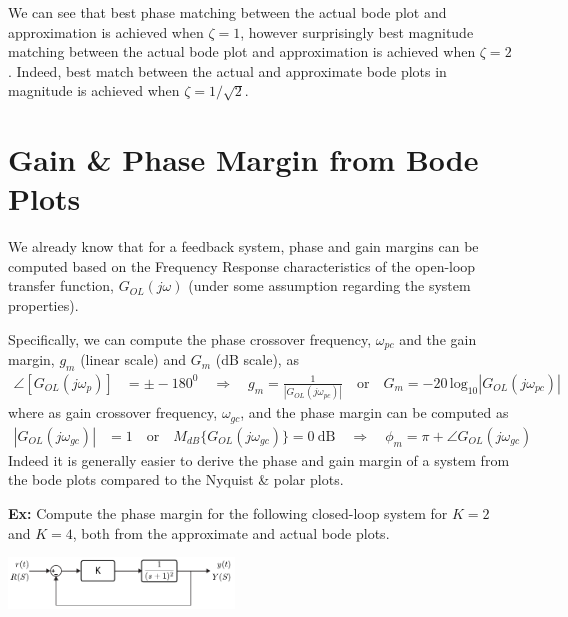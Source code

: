 \documentclass[twoside]{article}
\begin{document}
\vspace{6 pt}

We can see that best phase matching between the actual bode plot and approximation is achieved when
$\zeta = 1$, however surprisingly best magnitude matching between the actual bode plot and approximation is achieved when
$\zeta = 2$. Indeed, best match between the actual and approximate bode plots in magnitude is achieved when $\zeta = 1/\sqrt{2}$. 

\newpage

\section{Gain \& Phase Margin from Bode Plots}

We already know that for a feedback system, phase and 
gain margins can be computed based on the Frequency Response
characteristics of the open-loop transfer function, $G_{OL}(j \omega)$ (under
some assumption regarding the system properties).

Specifically, we can compute the phase crossover frequency, $\omega_{pc}$ and the gain margin, 
$g_m$ (linear scale) and $G_m$ (dB scale), as
%
\begin{align*}
  \angle [ G_{OL}(j \omega_{p}) ] &= \pm -180^0
  \quad \Rightarrow \quad
  g_m = \frac{1}{| G_{OL}(j \omega_{pc})| } \quad \mathrm{or} \quad G_m
  = -20 \, \mathrm{log}_{10} | G_{OL}(j \omega_{pc} ) |
\end{align*}
%
where as gain crossover frequency, $\omega_{gc}$, and the 
phase margin can be computed as
%
\begin{align*}
  | G_{OL}(j \omega_{gc}) | &= 1 \quad \mathrm{or} \quad 
  M_{dB} \lbrace G_{OL}(j \omega_{gc}) \rbrace = 0 \ \mathrm{dB}
   \quad \Rightarrow \quad
  \phi_m = \pi + \angle G_{OL} (j \omega_{gc})
\end{align*}
% 
Indeed it is generally easier to derive the phase and gain margin of
a system from the bode plots compared to the Nyquist \& polar plots.

\textbf{Ex:} Compute the phase margin 
for the following closed-loop system for $K = 2$ and $K = 4$,
both from the approximate and actual bode plots. 

\begin{center}
\begin{minipage}[h]{\linewidth}
    \begin{center}
      \includegraphics[width=0.45\textwidth]{ex2block}
    \end{center}
\end{minipage}
\end{center}
\end{document}
